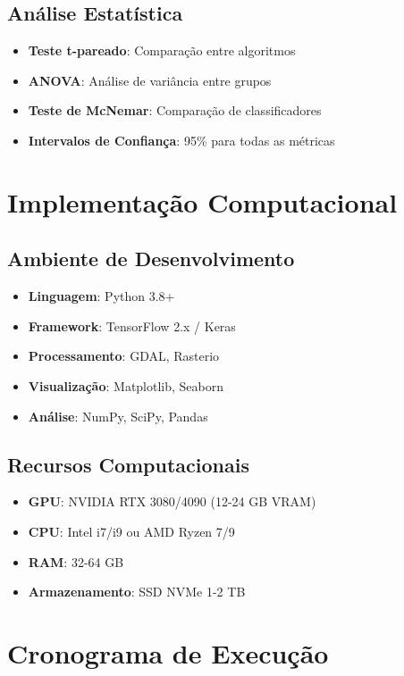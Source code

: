 \subsection{Análise Estatística}
\begin{itemize}
    \item \textbf{Teste t-pareado}: Comparação entre algoritmos
    \item \textbf{ANOVA}: Análise de variância entre grupos
    \item \textbf{Teste de McNemar}: Comparação de classificadores
    \item \textbf{Intervalos de Confiança}: 95\% para todas as métricas
\end{itemize}

\section{Implementação Computacional}\label{sec:implementacao}

\subsection{Ambiente de Desenvolvimento}
\begin{itemize}
    \item \textbf{Linguagem}: Python 3.8+
    \item \textbf{Framework}: TensorFlow 2.x / Keras
    \item \textbf{Processamento}: GDAL, Rasterio
    \item \textbf{Visualização}: Matplotlib, Seaborn
    \item \textbf{Análise}: NumPy, SciPy, Pandas
\end{itemize}

\subsection{Recursos Computacionais}
\begin{itemize}
    \item \textbf{GPU}: NVIDIA RTX 3080/4090 (12-24 GB VRAM)
    \item \textbf{CPU}: Intel i7/i9 ou AMD Ryzen 7/9
    \item \textbf{RAM}: 32-64 GB
    \item \textbf{Armazenamento}: SSD NVMe 1-2 TB
\end{itemize}

\section{Cronograma de Execução}\label{sec:cronograma}

